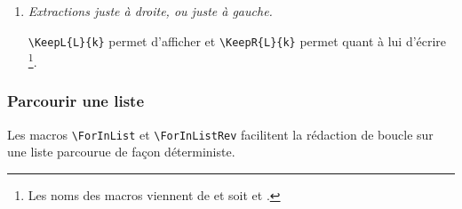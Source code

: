 \documentclass[12pt,a4paper]{article}
\begin{document}
\begin{enumerate}
	\item \textit{Extractions juste à droite, ou juste à gauche.}

	      \verb+\KeepL{L}{k}+ permet d'afficher  et \verb++ permet quant à lui d'écrire \KeepR{L}{k}
	      \footnote{
	      	Les noms des macros viennent de  et  soit  et .
		  }.
\end{enumerate}



\subsubsection{Parcourir une liste}

Les macros \verb+\ForInList+ et \verb+\ForInListRev+ facilitent la rédaction de boucle sur une liste parcourue de façon déterministe.


\newpage

\end{document}
